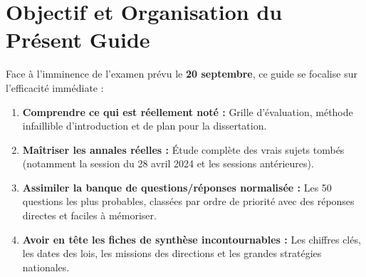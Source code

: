\section*{Objectif et Organisation du Présent Guide}
Face à l'imminence de l'examen prévu le \textbf{20 septembre}, ce guide se focalise sur l'efficacité immédiate :
\begin{enumerate}
    \item \textbf{Comprendre ce qui est réellement noté :} Grille d'évaluation, méthode infaillible d'introduction et de plan pour la dissertation.
    \item \textbf{Maîtriser les annales réelles :} Étude complète des vrais sujets tombés (notamment la session du 28 avril 2024 et les sessions antérieures).
    \item \textbf{Assimiler la banque de questions/réponses normalisée :} Les 50 questions les plus probables, classées par ordre de priorité avec des réponses directes et faciles à mémoriser.
    \item \textbf{Avoir en tête les fiches de synthèse incontournables :} Les chiffres clés, les dates des lois, les missions des directions et les grandes stratégies nationales.
\end{enumerate}
